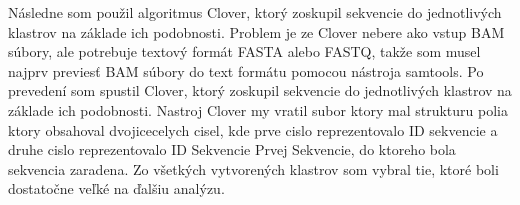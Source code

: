 Následne som použil algoritmus Clover, ktorý zoskupil sekvencie do jednotlivých klastrov na základe ich podobnosti.
Problem je ze Clover nebere ako vstup BAM súbory, ale potrebuje textový formát FASTA alebo FASTQ, takže som musel najprv previesť BAM súbory do text formátu pomocou nástroja samtools. %
Po prevedení som spustil Clover, ktorý zoskupil sekvencie do jednotlivých klastrov na základe ich podobnosti.
Nastroj Clover my vratil subor ktory mal strukturu polia ktory obsahoval dvojicecelych cisel, kde prve cislo reprezentovalo ID sekvencie a druhe cislo reprezentovalo ID Sekvencie Prvej Sekvencie, do ktoreho bola sekvencia zaradena.
Zo všetkých vytvorených klastrov som vybral tie, ktoré boli dostatočne veľké na ďalšiu analýzu.
